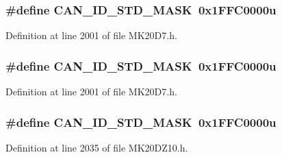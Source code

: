 \subsubsection[{\texorpdfstring{C\+A\+N\+\_\+\+I\+D\+\_\+\+S\+T\+D\+\_\+\+M\+A\+SK}{CAN_ID_STD_MASK}}]{\setlength{\rightskip}{0pt plus 5cm}\#define C\+A\+N\+\_\+\+I\+D\+\_\+\+S\+T\+D\+\_\+\+M\+A\+SK~0x1\+F\+F\+C0000u}\hypertarget{group___c_a_n___register___masks_ga35a257f1f6dd8ee576becf1f05e995c2}{}\label{group___c_a_n___register___masks_ga35a257f1f6dd8ee576becf1f05e995c2}


Definition at line 2001 of file M\+K20\+D7.\+h.

\subsubsection[{\texorpdfstring{C\+A\+N\+\_\+\+I\+D\+\_\+\+S\+T\+D\+\_\+\+M\+A\+SK}{CAN_ID_STD_MASK}}]{\setlength{\rightskip}{0pt plus 5cm}\#define C\+A\+N\+\_\+\+I\+D\+\_\+\+S\+T\+D\+\_\+\+M\+A\+SK~0x1\+F\+F\+C0000u}\hypertarget{group___c_a_n___register___masks_ga35a257f1f6dd8ee576becf1f05e995c2}{}\label{group___c_a_n___register___masks_ga35a257f1f6dd8ee576becf1f05e995c2}


Definition at line 2001 of file M\+K20\+D7.\+h.

\subsubsection[{\texorpdfstring{C\+A\+N\+\_\+\+I\+D\+\_\+\+S\+T\+D\+\_\+\+M\+A\+SK}{CAN_ID_STD_MASK}}]{\setlength{\rightskip}{0pt plus 5cm}\#define C\+A\+N\+\_\+\+I\+D\+\_\+\+S\+T\+D\+\_\+\+M\+A\+SK~0x1\+F\+F\+C0000u}\hypertarget{group___c_a_n___register___masks_ga35a257f1f6dd8ee576becf1f05e995c2}{}\label{group___c_a_n___register___masks_ga35a257f1f6dd8ee576becf1f05e995c2}


Definition at line 2035 of file M\+K20\+D\+Z10.\+h.


